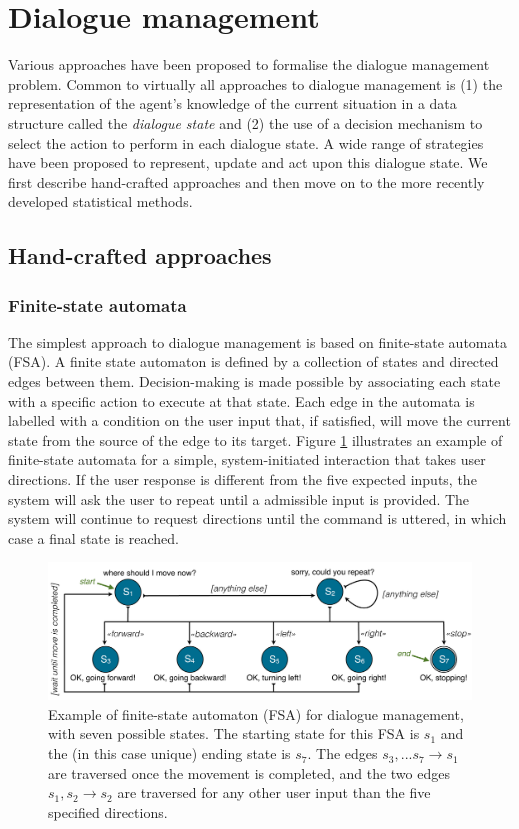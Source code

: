 \section{Dialogue management}
\label{sec:dm}

Various approaches have been proposed to formalise the dialogue management problem.  Common to virtually all approaches to dialogue management is (1) the representation of the agent's knowledge of the current situation in a data structure called the \textit{dialogue state} and (2) the use of a decision mechanism to select the action to perform in each dialogue state. A wide range of strategies have been proposed to represent, update and act upon this dialogue state.  We first describe hand-crafted approaches and then move on to the more recently developed statistical methods. 

\subsection{Hand-crafted approaches}
\label{sec:handcrafted}

\subsubsection*{Finite-state automata}

The simplest approach to dialogue management is based on finite-state automata (FSA).  A finite state automaton is defined by a collection of states and directed edges between them.  Decision-making is made possible by associating each state with a specific action to execute at that state. Each edge in the automata is labelled with a condition on the user input that, if satisfied, will move the current state from the source of the edge to its target.  Figure \ref{fig:fsa} illustrates an example of finite-state automata for a simple, system-initiated interaction that takes user directions.  If the user response is different from the five expected inputs, the system will ask the user to repeat until a admissible input is provided.  The system will continue to request directions until the  command is uttered, in which case a final state is reached. 


\begin{figure}[h]
\centering
\includegraphics[scale=0.35]{imgs/fsa.pdf}
\caption{Example of finite-state automaton (FSA) for dialogue management, with seven possible states. The starting state for this FSA is $s_1$ and the (in this case unique) ending state is $s_7$. The edges $s_3,... s_7 \rightarrow s_1$ are traversed once the movement is completed, and the two edges $s_1, s_2 \rightarrow s_2$ are traversed for any other user input than the five specified directions.}
\label{fig:fsa}
\end{figure}

